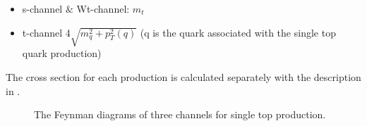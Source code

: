 \begin{itemize}
	\item s-channel $\&$ Wt-channel: $m_{t}$
	\item t-channel 4\times$\sqrt{m_{q}^2+p^2_{T}(q)}$ (q is the quark  associated with the single top quark production)
\end{itemize}
The cross section for each production is calculated separately with the description in \cite{Kidonakis:2011wy,Kidonakis:2010ux}.
\begin{figure}[htp]
	\centering
	\hfill
	\hfill
	\caption{The Feynman diagrams of three channels for single top production.}
	\label{Fig:singletop}
\end{figure}

